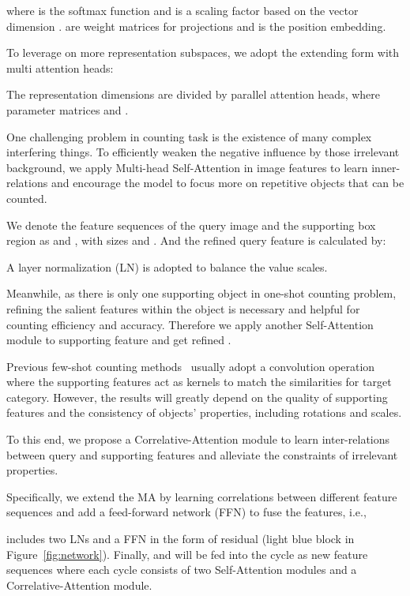 \documentclass{article}
\begin{document}
where  is the softmax function and  is a scaling factor based on the vector dimension .  are weight matrices for projections and  is the position embedding.

To leverage on more representation subspaces, we adopt the extending form with multi attention heads:

The representation dimensions are divided by parallel attention heads, where parameter matrices  and .

One challenging problem in counting task is the existence of many complex interfering things. To efficiently weaken the negative influence by those irrelevant background, we apply Multi-head Self-Attention in image features to learn inner-relations and encourage the model to focus more on repetitive objects that can be counted.

We denote the feature sequences of the query image and the supporting box region as  and , with sizes  and . And the refined query feature is calculated by:

A layer normalization (LN) is adopted to balance the value scales.

Meanwhile, as there is only one supporting object in one-shot counting problem, refining the salient features within the object is necessary and helpful for counting efficiency and accuracy. Therefore we apply another Self-Attention module to supporting feature and get refined .

Previous few-shot counting methods~\cite{ranjan2021learning, yang2021class} usually adopt a convolution operation where the supporting features act as kernels to match the similarities for target category. However, the results will greatly depend on the quality of supporting features and the consistency of objects' properties, including rotations and scales.

To this end, we propose a Correlative-Attention module to learn inter-relations between query and supporting features and alleviate the constraints of irrelevant properties.

Specifically, we extend the MA by learning correlations between different feature sequences and add a feed-forward network (FFN) to fuse the features, i.e.,

 includes two LNs and a FFN in the form of residual (light blue block in Figure~\ref{fig:network}). Finally,  and  will be fed into the cycle as new feature sequences where each cycle consists of two Self-Attention modules and a Correlative-Attention module.
\end{document}
